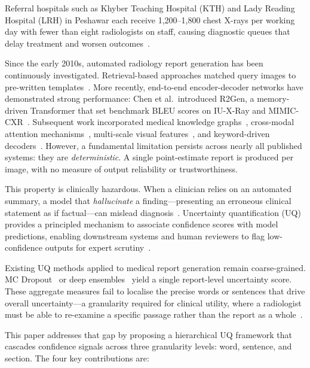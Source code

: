 \documentclass{jcst}
\begin{document}
Referral hospitals such as Khyber Teaching Hospital (KTH) and Lady Reading Hospital (LRH)
in Peshawar each receive 1,200--1,800 chest X-rays per working day with fewer than eight
radiologists on staff, causing diagnostic queues that delay treatment and worsen outcomes~\cite{kmu2022}.

Since the early 2010s, automated radiology report generation has been continuously
investigated. Retrieval-based approaches matched query images to pre-written templates~\cite{shin2016}.
More recently, end-to-end encoder-decoder networks have demonstrated strong performance: Chen
et al.\ introduced R2Gen, a memory-driven Transformer that set benchmark BLEU scores on
IU-X-Ray and MIMIC-CXR~\cite{chen2020}. Subsequent work incorporated medical knowledge
graphs~\cite{zhang2020}, cross-modal attention mechanisms~\cite{wang2021cross}, multi-scale
visual features~\cite{li2021}, and keyword-driven decoders~\cite{yang2021}. However, a
fundamental limitation persists across nearly all published systems: they are \emph{deterministic}.
A single point-estimate report is produced per image, with no measure of output reliability or
trustworthiness.

This property is clinically hazardous. When a clinician relies on an automated summary, a model
that \emph{hallucinate} a finding---presenting an erroneous clinical statement as if factual---can
mislead diagnosis~\cite{balachandran2022}. Uncertainty quantification (UQ) provides a
principled mechanism to associate confidence scores with model predictions, enabling downstream
systems and human reviewers to flag low-confidence outputs for expert scrutiny~\cite{gal2016,lakshminarayanan2017}.

Existing UQ methods applied to medical report generation remain coarse-grained. MC
Dropout~\cite{gal2016} or deep ensembles~\cite{lakshminarayanan2017} yield a single
report-level uncertainty score. These aggregate measures fail to localise the precise words or
sentences that drive overall uncertainty---a granularity required for clinical utility, where a
radiologist must be able to re-examine a specific passage rather than the report as a whole~\cite{shelmanov2021}.

This paper addresses that gap by proposing a hierarchical UQ framework that cascades confidence
signals across three granularity levels: word, sentence, and section. The four key contributions are:
\end{document}
